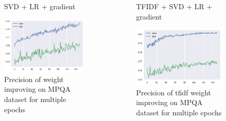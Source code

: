 \documentclass[xcolor={table}]{beamer}
\begin{document}
\begin{frame}{}
    \begin{columns}
            \begin{figure}[H]
                \centering
                \caption*{SVD + LR + gradient}
                \includegraphics[height=0.4\textheight]{images/MPQADataset_grad.png}
                \caption{Precision of weight improving on MPQA dataset for multiple epochs}
            \end{figure}

            \begin{figure}[H]
                \centering
                \caption*{TFIDF + SVD + LR + gradient}
                \includegraphics[height=0.4\textheight]{images/MPQADataset_tfidf_grad.png}
                \caption{Precision of tfidf weight improving on MPQA dataset for multiple epochs}
            \end{figure}
    \end{columns}                
\end{frame} 
\end{document}
